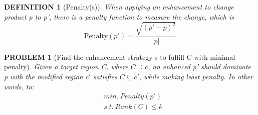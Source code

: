 \documentclass{IEEEtran}%
\newtheorem{definition}{D\scriptsize EFINITION}
\newtheorem{problem}{P\scriptsize ROBLEM}
\begin{document}
	\begin{definition}[Penalty(s)]
		When applying an enhancement to change product p to p', there is a penalty function to measure the change, which is 
		\[\text{Penalty}(p') = \frac{\sqrt{(p'-p)^2}}{|p|}\]
	\end{definition}
	
	\begin{problem}[Find the enhancement strategy s to fulfill C with minimal penalty]
        Given a target region C, where $C \supseteq c $, an enhanced p' should dominate p with the modified region $c'$ satisfies $C \subseteq c'$, while making least penalty. In other words, to:
        \begin{align}
        &min. \  Penalty(p')\\
        &s.t.    \ Rank(C) \le k 
        \end{align}
	\end{problem}
\end{document}
